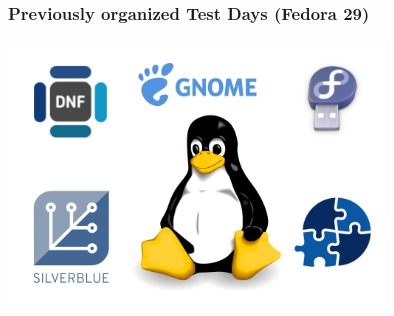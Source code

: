 \documentclass[12pt]{beamer}
\begin{document}
\begin{frame}
\frametitle{Previously organized Test Days (Fedora 29)}
	\begin{center}
	\includegraphics[width=10cm]{images/previous.png}
	\end{center}

\end{frame}
\end{document}

